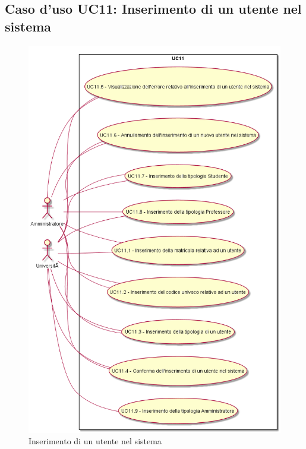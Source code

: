 \subsection{Caso d'uso \texorpdfstring{UC11}{UC11}: Inserimento di un utente nel sistema}
\begin{figure} [H]
\centering
\includegraphics[scale=0.45]{./img/UC11.png}
\caption{Inserimento di un utente nel sistema}\label{}
\end{figure}
